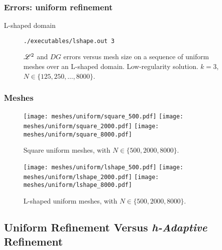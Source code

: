 \begin{frame}[fragile]
    \frametitle{Errors: uniform refinement}

    \begin{description}
        \item[L-shaped domain] \lstinline{./executables/lshape.out 3}
    \end{description}    

    \begin{figure}[!ht]
        
        \caption{$\mathscr{L}^2$ and $DG$ errors versus mesh size on a sequence of uniform meshes over an L-shaped domain. Low-regularity solution. $k = 3$, $N \in \{125, 250, \dots, 8000\}$.}
    \end{figure}
\end{frame}

\begin{frame}
    \frametitle{Meshes}

    \begin{figure}[!ht]
        \centering
        \texttt{[image: meshes/uniform/square\_500.pdf]}
        \texttt{[image: meshes/uniform/square\_2000.pdf]}
        \texttt{[image: meshes/uniform/square\_8000.pdf]}
        \caption{Square uniform meshes, with $N \in \{500, 2000, 8000\}$.}
    \end{figure}

    \begin{figure}[!ht]
        \centering
        \texttt{[image: meshes/uniform/lshape\_500.pdf]}
        \texttt{[image: meshes/uniform/lshape\_2000.pdf]}
        \texttt{[image: meshes/uniform/lshape\_8000.pdf]}
        \caption{L-shaped uniform meshes, with $N \in \{500, 2000, 8000\}$.}
    \end{figure}
\end{frame}

\subsection{Uniform Refinement Versus \textit{h-Adaptive} Refinement}

